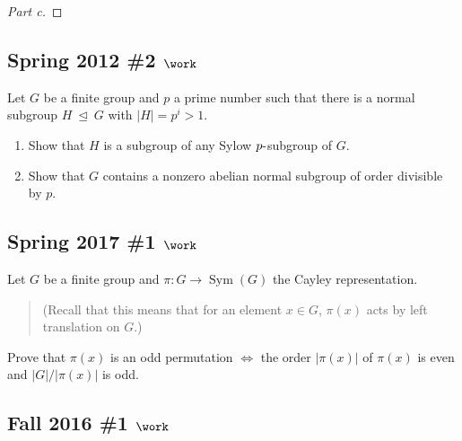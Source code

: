 \begin{solution}
\begin{proof}[Part c]
\end{proof}


\end{solution}

\hypertarget{spring-2012-2-work}{%
\subsection{\texorpdfstring{Spring 2012 \#2
\(\work\)}{Spring 2012 \#2 \textbackslash work}}\label{spring-2012-2-work}}

Let \(G\) be a finite group and \(p\) a prime number such that there is
a normal subgroup \(H{~\trianglelefteq~}G\) with
\({\left\lvert {H} \right\rvert} = p^i > 1\).

\begin{enumerate}
\def\labelenumi{\alph{enumi}.}
\item
  Show that \(H\) is a subgroup of any Sylow \(p{\hbox{-}}\)subgroup of
  \(G\).
\item
  Show that \(G\) contains a nonzero abelian normal subgroup of order
  divisible by \(p\).
\end{enumerate}

\hypertarget{spring-2017-1-work}{%
\subsection{\texorpdfstring{Spring 2017 \#1
\(\work\)}{Spring 2017 \#1 \textbackslash work}}\label{spring-2017-1-work}}

Let \(G\) be a finite group and \(\pi: G\to \operatorname{Sym}(G)\) the
Cayley representation.

\begin{quote}
(Recall that this means that for an element \(x\in G\), \(\pi(x)\) acts
by left translation on \(G\).)
\end{quote}

Prove that \(\pi(x)\) is an odd permutation \(\iff\) the order
\({\left\lvert {\pi(x)} \right\rvert}\) of \(\pi(x)\) is even and
\({\left\lvert {G} \right\rvert} / {\left\lvert {\pi(x)} \right\rvert}\)
is odd.

\hypertarget{fall-2016-1-work}{%
\subsection{\texorpdfstring{Fall 2016 \#1
\(\work\)}{Fall 2016 \#1 \textbackslash work}}\label{fall-2016-1-work}}

